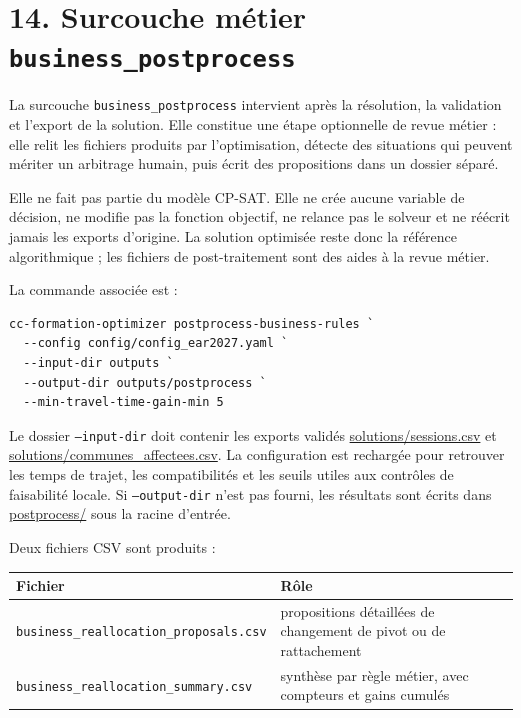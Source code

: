 \documentclass[11pt,a4paper]{article}
\begin{document}
\section{14. Surcouche métier \texttt{business\_postprocess}}

La surcouche \texttt{business\_postprocess} intervient après la résolution, la validation et l'export de la solution. Elle constitue une étape optionnelle de revue métier : elle relit les fichiers produits par l'optimisation, détecte des situations qui peuvent mériter un arbitrage humain, puis écrit des propositions dans un dossier séparé.

Elle ne fait pas partie du modèle CP-SAT. Elle ne crée aucune variable de décision, ne modifie pas la fonction objectif, ne relance pas le solveur et ne réécrit jamais les exports d'origine. La solution optimisée reste donc la référence algorithmique ; les fichiers de post-traitement sont des aides à la revue métier.

La commande associée est :

\begin{verbatim}
cc-formation-optimizer postprocess-business-rules `
  --config config/config_ear2027.yaml `
  --input-dir outputs `
  --output-dir outputs/postprocess `
  --min-travel-time-gain-min 5
\end{verbatim}

Le dossier \texttt{--input-dir} doit contenir les exports validés \url{solutions/sessions.csv} et \url{solutions/communes_affectees.csv}. La configuration est rechargée pour retrouver les temps de trajet, les compatibilités et les seuils utiles aux contrôles de faisabilité locale. Si \texttt{--output-dir} n'est pas fourni, les résultats sont écrits dans \url{postprocess/} sous la racine d'entrée.

Deux fichiers CSV sont produits :

\begin{longtable}{|L{0.40\textwidth}|L{0.50\textwidth}|}
\hline
Fichier & Rôle \\
\hline
\endhead
\texttt{business\_reallocation\_}\newline\texttt{proposals.csv} & propositions détaillées de changement de pivot ou de rattachement \\
\hline
\texttt{business\_reallocation\_}\newline\texttt{summary.csv} & synthèse par règle métier, avec compteurs et gains cumulés \\
\hline
\end{longtable}
\end{document}
